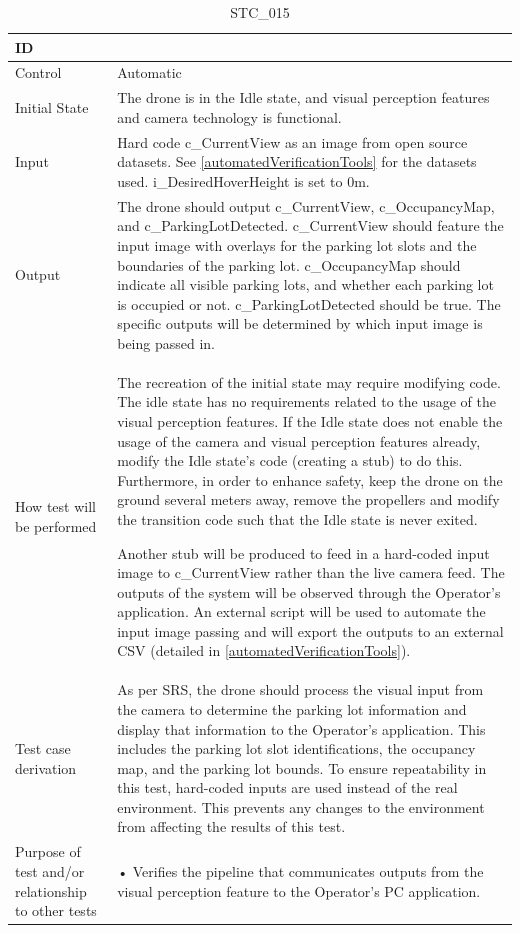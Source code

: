 \documentclass[12pt, titlepage]{article}
\begin{document}
\begin{table}[!h]
\begin{center}
\caption {STC\_015}
\label{tab:STC_015}
\begin{tabular}{ | m{1.5cm} | m{15cm} | } 
\hline
ID & \nameref{tab:STC_015} \\ 
\hline
Control & Automatic \\ 
\hline
Initial State & The drone is in the Idle state, and visual perception features and camera technology is functional.
\\ 
\hline
Input & Hard code c\_CurrentView as an image from open source datasets. See \ref{automatedVerificationTools} for the datasets used. i\_DesiredHoverHeight is set to 0m. \\ 
\hline
Output & The drone should output c\_CurrentView, c\_OccupancyMap, and c\_ParkingLotDetected. c\_CurrentView should feature the input image with overlays for the parking lot slots and the boundaries of the parking lot. c\_OccupancyMap should indicate all visible parking lots, and whether each parking lot is occupied or not. c\_ParkingLotDetected should be true. The specific outputs will be determined by which input image is being passed in. \\ 
\hline
How test will be performed & The recreation of the initial state may require modifying code. The idle state has no requirements related to the usage of the visual perception features. If the Idle state does not enable the usage of the camera and visual perception features already, modify the Idle state's code (creating a stub) to do this. Furthermore, in order to enhance safety, keep the drone on the ground several meters away, remove the propellers and modify the transition code such that the Idle state is never exited. 

Another stub will be produced to feed in a hard-coded input image to c\_CurrentView rather than the live camera feed. The outputs of the system will be observed through the Operator's application. An external script will be used to automate the input image passing and will export the outputs to an external CSV (detailed in \ref{automatedVerificationTools}). \\ 
\hline
Test case derivation & As per SRS, the drone should process the visual input from the camera to determine the parking lot information and display that information to the Operator's application. This includes the parking lot slot identifications, the occupancy map, and the parking lot bounds. To ensure repeatability in this test, hard-coded inputs are used instead of the real environment. This prevents any changes to the environment from affecting the results of this test.  \\ 
\hline
Purpose of test and/or relationship to other tests &  • Verifies the pipeline that communicates outputs from the visual perception feature to the Operator's PC application.


\end{tabular}
\end{center}
\end{table}
\end{document}
